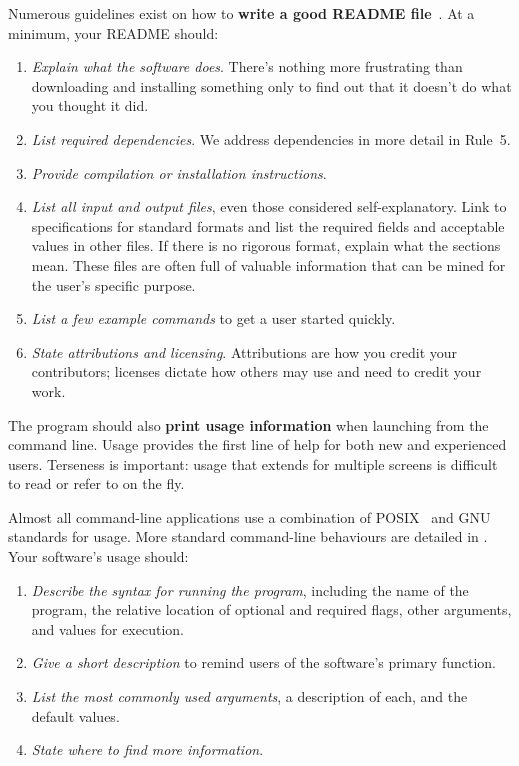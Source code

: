 \documentclass[10pt,letterpaper]{article}
\newcommand{\ruleminor}[1]{\textbf{#1}}
\begin{document}
Numerous guidelines exist on how to \ruleminor{write a good
README file}~\cite{Johnson1997,gnustandards}. 
At a minimum, your README should:
 

\begin{enumerate}

\item \textit{Explain what the software does}.
There's nothing more frustrating
than downloading and installing something only to
find out that it doesn't do what you thought it did.

\item \textit{List required dependencies}.
We address dependencies in more detail in Rule~5.

\item \textit{Provide compilation or installation instructions}.

\item \textit{List all input and output files},
even those considered self-explanatory. 
Link to specifications for standard formats
and list the required fields and acceptable values in other files.
If there is no rigorous format, explain what the sections mean.
These files are often full of valuable information that can be
mined for the user's specific purpose.

\item \textit{List a few example commands} to get a user started quickly.

\item \textit{State attributions and licensing}. Attributions are how you credit
your contributors; licenses dictate how others may use and
need to credit your work.
\end{enumerate}

The program should also 
\ruleminor{print usage information} when launching from the command line.
Usage provides the first line of help for both new and experienced users. 
Terseness is important: usage that extends for multiple screens is 
difficult to read or refer to on the fly.

Almost all command-line applications use a combination of
POSIX~\cite{posix2016} and GNU~\cite{gnustandards} standards for usage. 
More standard command-line behaviours are detailed in \cite{Seemann2013}.
Your software's usage should:

\begin{enumerate}

\item \textit{Describe the syntax for running the program}, including the
  name of the program, the relative location of optional
  and required flags, other arguments, and values for execution.

\item \textit{Give a short description} to remind users of the software's primary function.

\item \textit{List the most commonly used arguments}, a description of each, and
    the default values.

\item \textit{State where to find more information}.

\end{enumerate}
\end{document}
